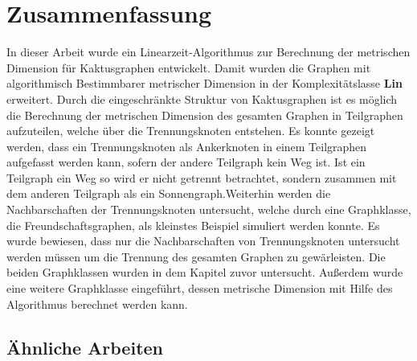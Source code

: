 \chapter{Zusammenfassung}
\vspace{-5mm}
In dieser Arbeit wurde ein Linearzeit-Algorithmus zur Berechnung der metrischen Dimension für Kaktusgraphen entwickelt. Damit wurden die Graphen mit algorithmisch Bestimmbarer metrischer Dimension in der Komplexitätslasse \textbf{Lin} erweitert.\vspace{-1.5mm}\newline\newline
Durch die eingeschränkte Struktur von Kaktusgraphen ist es möglich die Berechnung der metrischen Dimension des gesamten Graphen in Teilgraphen aufzuteilen, welche über die Trennungsknoten entstehen. Es konnte gezeigt werden, dass ein Trennungsknoten als Ankerknoten in einem Teilgraphen aufgefasst werden kann, sofern der andere Teilgraph kein Weg ist. Ist ein Teilgraph ein Weg so wird er nicht getrennt betrachtet, sondern zusammen mit dem anderen Teilgraph als ein Sonnengraph.\newline Weiterhin werden die Nachbarschaften der Trennungsknoten untersucht, welche durch eine Graphklasse, die Freundschaftsgraphen, als kleinstes Beispiel simuliert werden konnte. Es wurde bewiesen, dass nur die Nachbarschaften von Trennungsknoten untersucht werden müssen um die Trennung des gesamten Graphen zu gewärleisten. \vspace{-1.5mm}\newline\newline
Die beiden Graphklassen wurden in dem Kapitel zuvor untersucht. Außerdem wurde eine weitere Graphklasse eingeführt, dessen metrische Dimension mit Hilfe des Algorithmus berechnet werden kann.
\vspace{-5mm}
\section{Ähnliche Arbeiten}
\vspace{-3mm}
